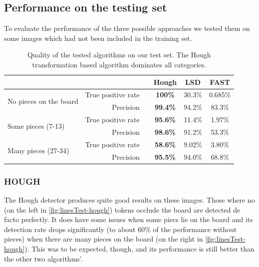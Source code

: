 	\subsection{Performance on the testing set}
	\label{evaluation-visible-performance}
	To evaluate the performance of the three possible approaches we tested them on some images which had not been included in the training set.

	\begin{table}[b!]
		\begin{tabular}{lrc>{\bfseries}ccc}
		    \multicolumn{2}{c}{}									&\hphantom{Abst} & Hough 	& LSD 		& FAST     \\

			\toprule
			\multirow{2}{*}{No pieces on the board}   		& True positive rate 	&& 100\%	& 30.3\%  	& 0.685\%  \\
															& Precision			 	&& 99.4\% 	& 94.2\%  	& 83.3\%  \\
			\midrule
			\multirow{2}{*}{Some pieces (7-13)}				& True positive rate 	&& 95.6\% 	& 11.4\% 	& 1.97\%   \\
															& Precision 			&& 98.6\% 	& 91.2\%  	& 53.3\%  \\
			\midrule
			\multirow{2}{*}{Many pieces (27-34)} 			& True positive rate 	&& 58.6\% 	& 9.02\% 	& 3.80\%   \\
															& Precision			 	&& 95.5\% 	& 94.0\%  	& 68.8\%  \\
			\bottomrule
		\end{tabular}
		\caption{Quality of the tested algorithms on our test set. The Hough transformation based algorithm dominates all categories.}
		\label{tab:linesTest}
	\end{table}

	\subsubsection{HOUGH}
	\label{evaluation-visible-performance-hough}
	The Hough detector produces quite good results on these images. Those where no (on the left in \autoref{fig:linesTest-hough}) tokens occlude the board are detected de facto perfectly. It does have some issues when some piecs lie on the board and its detection rate drops significantly (to about 60\% of the performance without pieces) when there are many pieces on the board (on the right in \autoref{fig:linesTest-hough}). This was to be expected, though, and its performance is still better than the other two algorithms'.

